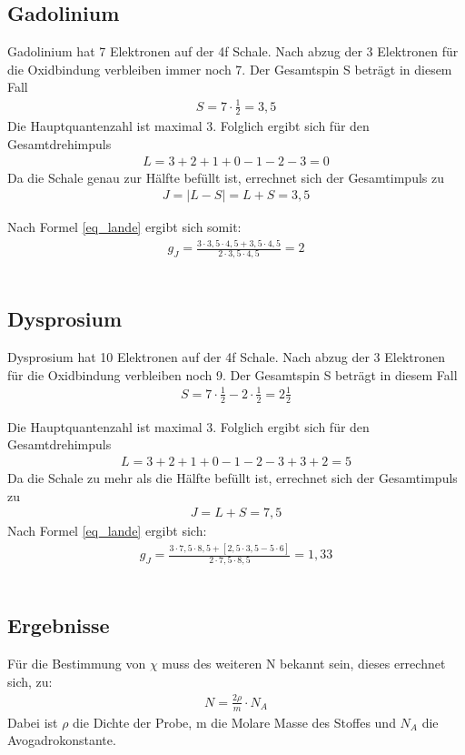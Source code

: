 \subsection{Gadolinium }
Gadolinium hat 7 Elektronen auf der 4f Schale. Nach abzug der 3 Elektronen für die Oxidbindung verbleiben immer noch 7. Der Gesamtspin S beträgt in diesem Fall \begin{align*}
S=7\cdot\frac{1}{2} = 3,5
\end{align*}
Die Hauptquantenzahl ist maximal 3. Folglich ergibt sich für den Gesamtdrehimpuls
\begin{align*}
L=3+2+1+0-1-2-3=0
\end{align*}
Da die Schale genau zur Hälfte befüllt ist, errechnet sich der Gesamtimpuls zu 
\begin{align*}
J=|L-S|=L+S=3,5
\end{align*}

Nach Formel \eqref{eq_lande} ergibt sich somit:
	\begin{align}
	g_J=\frac{3\cdot3,5\cdot4,5+3,5\cdot4,5}{2\cdot 3,5\cdot4,5}=2
	\end{align}\\

\subsection{Dysprosium }
Dysprosium hat 10 Elektronen auf der 4f Schale. Nach abzug der 3 Elektronen für die Oxidbindung verbleiben noch 9. Der Gesamtspin S beträgt in diesem Fall 
\begin{align*}
S= 7\cdot \frac{1}{2}-2\cdot\frac{1}{2}= 2 \frac{1}{2}
\end{align*}

Die Hauptquantenzahl ist maximal 3. Folglich ergibt sich für den Gesamtdrehimpuls
\begin{align*}
L= 3+2+1+0-1-2-3+3+2=5
\end{align*} 
Da die Schale zu mehr als die Hälfte befüllt ist, errechnet sich der Gesamtimpuls zu 
\begin{align*}
J=L+S=7,5
\end{align*}
Nach Formel \eqref{eq_lande} ergibt sich:
\begin{align}
g_J=\frac{3\cdot7,5\cdot8,5+[2,5\cdot3,5-5\cdot6]}{2\cdot 7,5\cdot8,5}=1,33
\end{align}\\

\subsection{Ergebnisse}
Für die Bestimmung von $\chi$ muss des weiteren N bekannt sein, dieses errechnet sich, zu:
\begin{align}
N=\frac{2\rho}{m}\cdot N_A
\end{align}
Dabei ist $\rho$ die Dichte der Probe, m die Molare Masse des Stoffes und $N_A$ die Avogadrokonstante.

